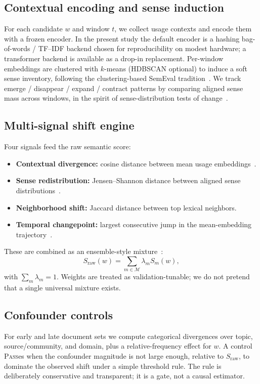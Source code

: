 \documentclass{llncs}
\begin{document}
\subsection{Contextual encoding and sense induction}
For each candidate $w$ and window $t$, we collect usage contexts and encode them with a frozen encoder.
In the present study the default encoder is a hashing bag-of-words / TF--IDF backend chosen for reproducibility on modest hardware; a transformer backend is available as a drop-in replacement.
Per-window embeddings are clustered with $k$-means (HDBSCAN optional) to induce a soft sense inventory, following the clustering-based SemEval tradition~\cite{cuba2020sensecluster,rother2020cmce}.
We track emerge / disappear / expand / contract patterns by comparing aligned sense mass across windows, in the spirit of sense-distribution tests of change~\cite{tang2023cansense,arefyev2020bos}.

\subsection{Multi-signal shift engine}
Four signals feed the raw semantic score:
\begin{itemize}
\item \textbf{Contextual divergence:} cosine distance between mean usage embeddings~\cite{beck2020diasense,martinc2020discovery}.
\item \textbf{Sense redistribution:} Jensen--Shannon distance between aligned sense distributions~\cite{tang2023cansense}.
\item \textbf{Neighborhood shift:} Jaccard distance between top lexical neighbors.
\item \textbf{Temporal changepoint:} largest consecutive jump in the mean-embedding trajectory~\cite{zhou2020temporalteller,periti2023studying}.
\end{itemize}
These are combined as an ensemble-style mixture~\cite{gruppi2020schme,ansari2026rtlsdr}:
\begin{equation}
S_{\mathrm{raw}}(w)=\sum_{m\in\mathcal{M}} \lambda_m S_m(w),
\end{equation}
with $\sum_m \lambda_m=1$.
Weights are treated as validation-tunable; we do not pretend that a single universal mixture exists.

\subsection{Confounder controls}
For early and late document sets we compute categorical divergences over topic, source/community, and domain, plus a relative-frequency effect for $w$.
A control \textsc{Pass}es when the confounder magnitude is not large enough, relative to $S_{\mathrm{raw}}$, to dominate the observed shift under a simple threshold rule.
The rule is deliberately conservative and transparent; it is a gate, not a causal estimator.
\end{document}
